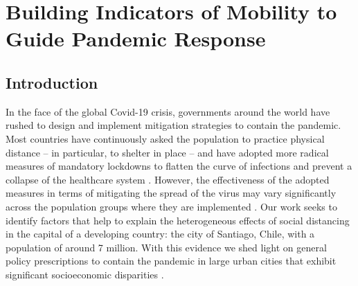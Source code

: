 \chapter{Building Indicators of Mobility to Guide Pandemic Response}

\section{Introduction}
In the face of the global Covid-19 crisis, governments around the world have rushed to design and implement mitigation strategies to contain the pandemic. Most countries have continuously asked the population to practice physical distance -- in particular, to shelter in place -- and have adopted more radical measures of mandatory lockdowns
to  flatten the curve of infections and prevent a collapse of the healthcare system \citep{hsiang2020effect}. However, the effectiveness of the adopted measures in terms of mitigating the spread of the virus may vary significantly across the population groups where they are implemented \citep{allcott2020polarization,lamb2021differential}. Our work seeks to identify factors that help to explain the heterogeneous effects of social distancing  in the capital of  a developing country:  the city of Santiago, Chile, with a population of around 7 million. With this evidence we shed light on general policy prescriptions to contain the pandemic in large urban cities that exhibit significant socioeconomic  disparities \citep{florida2017new}.

